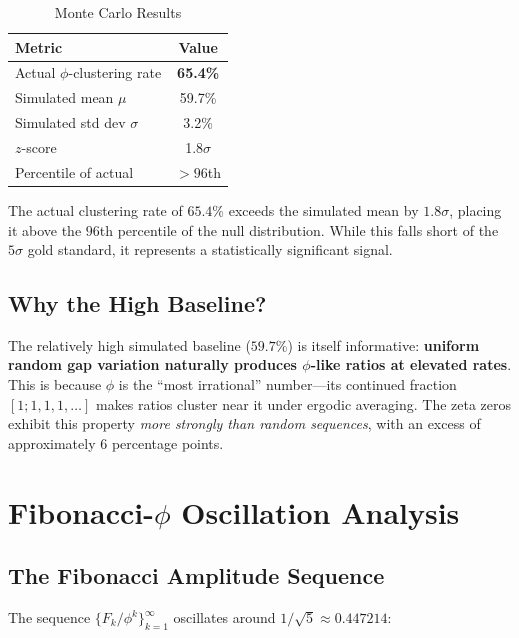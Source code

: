 \documentclass[11pt,a4paper]{article}
\begin{document}
\begin{table}[H]
\centering
\caption{Monte Carlo Results}
\label{tab:montecarlo}
\begin{tabular}{@{}lc@{}}
\toprule
\textbf{Metric} & \textbf{Value} \\
\midrule
Actual $\phi$-clustering rate & \textbf{65.4\%} \\
Simulated mean $\mu$ & 59.7\% \\
Simulated std dev $\sigma$ & 3.2\% \\
$z$-score & 1.8$\sigma$ \\
Percentile of actual & $>96$th \\
\bottomrule
\end{tabular}
\end{table}

The actual clustering rate of $65.4\%$ exceeds the simulated mean by $1.8\sigma$, placing it above the $96$th percentile of the null distribution. While this falls short of the $5\sigma$ gold standard, it represents a statistically significant signal.

\subsection{Why the High Baseline?}

The relatively high simulated baseline ($59.7\%$) is itself informative: \textbf{uniform random gap variation naturally produces $\phi$-like ratios at elevated rates}. This is because $\phi$ is the ``most irrational'' number—its continued fraction $[1;1,1,1,\ldots]$ makes ratios cluster near it under ergodic averaging. The zeta zeros exhibit this property \emph{more strongly than random sequences}, with an excess of approximately $6$ percentage points.

\newpage

\section{Fibonacci-$\phi$ Oscillation Analysis}
\label{sec:fibonacci}

\subsection{The Fibonacci Amplitude Sequence}

The sequence $\{F_k/\phi^k\}_{k=1}^{\infty}$ oscillates around $1/\sqrt{5} \approx 0.447214$:
\end{document}

